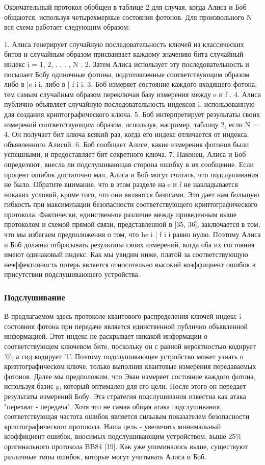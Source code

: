 Окончательный протокол обобщен в таблице 2 для случая, когда Алиса и Боб общаются, используя четырехмерные состояния фотонов. Для произвольного N вся схема работает следующим образом:

1. Алиса генерирует случайную последовательность ключей из классических битов и случайным образом присваивает каждому значению бита случайный индекс i = 1, 2, . . . , N .
2. Затем Алиса использует эту последовательность и посылает Бобу одиночные фотоны, подготовленные соответствующим образом либо в |e i i, либо в | f i i.
3. Боб измеряет состояние каждого входящего фотона, тем самым случайным образом переключая базу измерения между e и f .
4. Алиса публично объявляет случайную последовательность индексов i, использованную для создания криптографического ключа.
5. Боб интерпретирует результаты своих измерений соответствующим образом, используя, например, таблицу 2, если N = 4. Он получает бит ключа всякий раз, когда его индекс отличается от индекса, объявленного Алисой.
6. Боб сообщает Алисе, какие измерения фотонов были успешными, и предоставляет бит секретного ключа.
7. Наконец, Алиса и Боб определяют, внесла ли подслушивающая сторона ошибку в их сообщение. Если процент ошибок достаточно мал, Алиса и Боб могут считать, что подслушивания не было.
Обратите внимание, что в этом разделе на e и f не накладывается никаких условий, кроме того, что они являются базисами. Это дает нам большую гибкость при максимизации безопасности соответствующего криптографического протокола. Фактически, единственное различие между приведенным выше протоколом и схемой прямой связи, представленной в [35, 36], заключается в том, что мы избегаем предположения о том, что he i | f i i равно нулю. Поэтому Алиса и Боб должны отбрасывать результаты своих измерений, когда оба их состояния имеют одинаковый индекс. Как мы увидим ниже, платой за соответствующую неэффективность потерь является относительно высокий коэффициент ошибок в присутствии подслушивающего устройства.


\subsubsection{Подслушивание}

В предлагаемом здесь протоколе квантового распределения ключей индекс i состояния фотона при передаче является единственной публично объявленной информацией. Этот индекс не раскрывает никакой информации о соответствующем ключевом бите, поскольку он с равной вероятностью кодирует '0', а сид кодирует '1'. Поэтому подслушивающее устройство может узнать о криптографическом ключе, только выполнив квантовые измерения передаваемых фотонов. Далее мы предположим, что Эван измеряет состояние каждого фотона, используя базис g, который оптимален для его цели. После этого он передает результаты измерений Бобу. Эта стратегия подслушивания известна как атака "перехват - передача". Хотя это не самая общая атака подслушивания, соответствующая частота ошибок является сильным показателем безопасности криптографического протокола. Наша цель - увеличить минимальный коэффициент ошибок, вносимых подслушивающим устройством, выше 25\% оригинального протокола BB84 [19]. Как уже упоминалось выше, существуют различные типы ошибок, которые могут учитывать Алиса и Боб.

